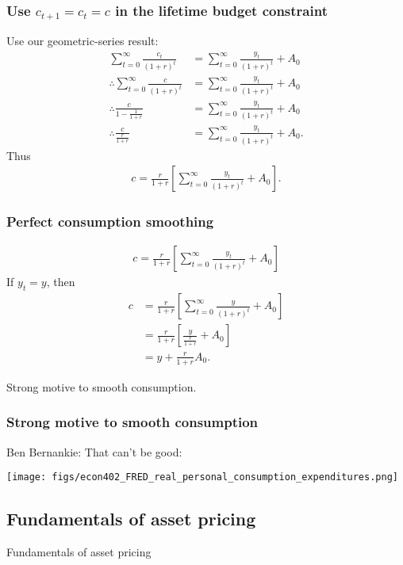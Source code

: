 \documentclass[presentation,dvipsnames]{beamer}
\begin{document}
\begin{frame}
\frametitle{Use $c_{t+1} = c_{t} = c$ in the lifetime budget constraint}
Use our geometric-series result:
\begin{align*}
\sum\limits_{t=0}^{\infty} \frac{c_{t}}{(1+r)^{t}} &=
\sum\limits_{t=0}^{\infty} \frac{y_{t}}{(1+r)^{t}} + A_{0} \\
\therefore \sum\limits_{t=0}^{\infty} \frac{c}{(1+r)^{t}} &=
\sum\limits_{t=0}^{\infty} \frac{y_{t}}{(1+r)^{t}} + A_{0} \\
\therefore \frac{c}{1- \frac{1}{1+r}} &=
\sum\limits_{t=0}^{\infty} \frac{y_{t}}{(1+r)^{t}} + A_{0} \\
\therefore \frac{c}{\frac{r}{1+r}} &=
\sum\limits_{t=0}^{\infty} \frac{y_{t}}{(1+r)^{t}} + A_{0}.
\end{align*}
Thus
\begin{align*}
c = \frac{r}{1+r} \left[ \sum\limits_{t=0}^{\infty} \frac{y_{t}}{(1+r)^{t}} + A_{0} \right].
\end{align*}
\end{frame}

\begin{frame}
\frametitle{Perfect consumption smoothing}
\begin{align*}
c = \frac{r}{1+r} \left[ \sum\limits_{t=0}^{\infty} \frac{y_{t}}{(1+r)^{t}} + A_{0} \right]
\end{align*}
If $y_{t} = y$, then
\begin{align*}
c &= \frac{r}{1+r} \left[ \sum\limits_{t=0}^{\infty} \frac{y}{(1+r)^{t}} + A_{0} \right] \\
&= \frac{r}{1+r} \left[ \frac{y}{\frac{r}{1+r}} + A_{0} \right] \\
&= y + \frac{r}{1+r} A_{0}.
\end{align*}

Strong motive to smooth consumption.
\end{frame}

\begin{frame}
\frametitle{Strong motive to smooth consumption}
Ben Bernankie: That can't be good:
\centerline{\texttt{[image: figs/econ402\_FRED\_real\_personal\_consumption\_expenditures.png]}}
\end{frame}

\subsection{Fundamentals of asset pricing}
\begin{frame}[label=sec-2-5]{Fundamentals of asset pricing}
\end{frame}
\end{document}
